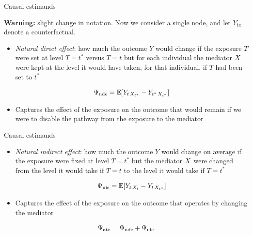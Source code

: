 \documentclass{beamer}
\theoremstyle{remark}
\begin{document}
\begin{frame}{Causal estimands}

    \textbf{Warning:} slight change in notation. Now we consider a single node, and let $Y_{t x}$ denote a counterfactual.

    \begin{itemize}
        \item \emph{Natural direct effect}: how much the outcome $Y$ would change if the exposure $T$ were set at level $T = t^*$ versus $T = t$ but for each individual the mediator $X$ were kept at the level it would have taken, for that individual, if $T$ had been set to $t^*$

              \begin{equation*}
                  \nde = \E{Y_{t \, \X_{t^*}} - Y_{t^* \, \X_{t^*}}}
              \end{equation*}

        \item Captures the effect of the exposure on the outcome that would remain if we were to disable the pathway from the exposure to the mediator

    \end{itemize}

\end{frame}

\begin{frame}{Causal estimands}

    \begin{itemize}
        \item \emph{Natural indirect effect}: how much the outcome $Y$ would change on average if the exposure were fixed at level $T = t^*$ but the mediator $X$ were changed from the level it would take if $T=t$ to the level it would take if $T = t^*$

              \begin{equation*}
                  \nie = \E{Y_{t \, \X_{t}} - Y_{t \, \X_{t^*}}}
              \end{equation*}

        \item Captures the effect of the exposure on the outcome that operates by changing the mediator
    \end{itemize}

    \begin{equation*}
        \Psi_\text{ate} = \Psi_\text{nde} + \Psi_\text{nie}
    \end{equation*}

\end{frame}
\end{document}
